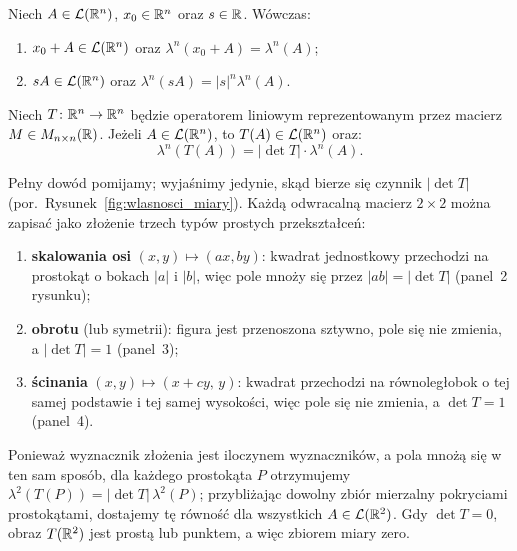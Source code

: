 \begin{tw}
    Niech $A \in \mathcal{L}({\mathbb{R}^{n}})$, $x_0 \in \mathbb{R}^{n}$ oraz $s \in \mathbb{R}$. Wówczas:
    \begin{enumerate}
        \item $x_0 + A \in \mathcal{L}({\mathbb{R}^{n}})$ oraz $\lambda^n(x_0 + A) = \lambda^n(A)$;
        \item $sA \in \mathcal{L}({\mathbb{R}^{n}})$ oraz $\lambda^n(sA) = |s|^n \lambda^n(A)$.
    \end{enumerate}
\end{tw}

\begin{tw}\label{tw:transformacja_liniowa}
    Niech $T \colon \mathbb{R}^{n} \to \mathbb{R}^{n}$ będzie operatorem liniowym reprezentowanym przez macierz $M \in M_{n \times n}(\mathbb{R})$. Jeżeli $A \in \mathcal{L}({\mathbb{R}^{n}})$, to $T(A) \in \mathcal{L}({\mathbb{R}^{n}})$ oraz:
    \begin{equation}
        \lambda^n(T(A)) = |\det T| \cdot \lambda^n(A).
    \end{equation}
\end{tw}

\begin{uwaga}[Intuicja geometryczna dla $n=2$]
    Pełny dowód pomijamy; wyjaśnimy jedynie, skąd bierze się czynnik $|\det T|$ (por.\ Rysunek~\ref{fig:wlasnosci_miary}). Każdą odwracalną macierz $2\times 2$ można zapisać jako złożenie trzech typów prostych przekształceń:
    \begin{enumerate}
        \item[(a)] \textbf{skalowania osi} $(x,y)\mapsto(ax,by)$: kwadrat jednostkowy przechodzi na prostokąt o bokach $|a|$ i $|b|$, więc pole mnoży się przez $|ab| = |\det T|$ (panel~2 rysunku);
        \item[(b)] \textbf{obrotu} (lub symetrii): figura jest przenoszona sztywno, pole się nie zmienia, a $|\det T| = 1$ (panel~3);
        \item[(c)] \textbf{ścinania} $(x,y)\mapsto(x+cy,\,y)$: kwadrat przechodzi na równoległobok o tej samej podstawie i tej samej wysokości, więc pole się nie zmienia, a $\det T = 1$ (panel~4).
    \end{enumerate}
    Ponieważ wyznacznik złożenia jest iloczynem wyznaczników, a pola mnożą się w ten sam sposób, dla każdego prostokąta $P$ otrzymujemy $\lambda^2(T(P)) = |\det T|\,\lambda^2(P)$; przybliżając dowolny zbiór mierzalny pokryciami prostokątami, dostajemy tę równość dla wszystkich $A \in \mathcal{L}({\mathbb{R}^2})$. Gdy $\det T = 0$, obraz $T(\mathbb{R}^2)$ jest prostą lub punktem, a więc zbiorem miary zero.
\end{uwaga}

